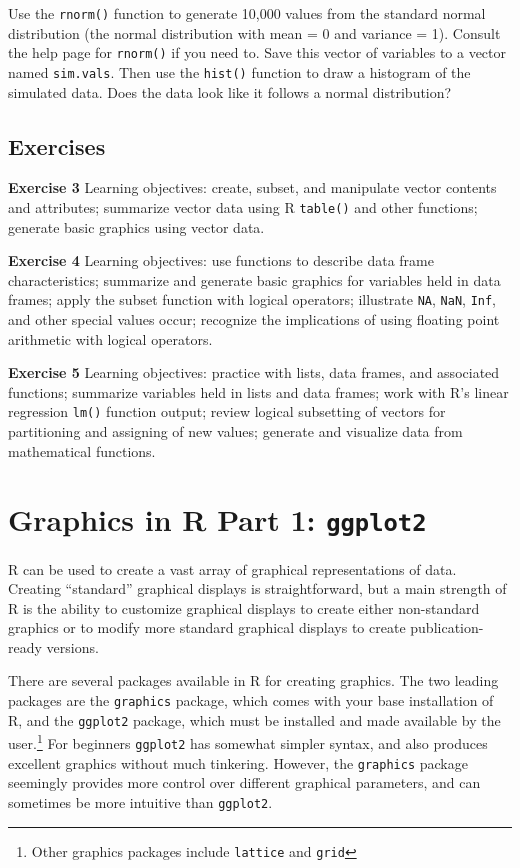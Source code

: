 \documentclass[]{krantz}
\begin{document}
Use the \texttt{rnorm()} function to generate 10,000 values from the
standard normal distribution (the normal distribution with mean = 0 and
variance = 1). Consult the help page for \texttt{rnorm()} if you need
to. Save this vector of variables to a vector named \texttt{sim.vals}.
Then use the \texttt{hist()} function to draw a histogram of the
simulated data. Does the data look like it follows a normal
distribution?

\section{Exercises}\label{exercises-1}

\textbf{Exercise 3} Learning objectives: create, subset, and manipulate
vector contents and attributes; summarize vector data using R
\texttt{table()} and other functions; generate basic graphics using
vector data.

\textbf{Exercise 4} Learning objectives: use functions to describe data
frame characteristics; summarize and generate basic graphics for
variables held in data frames; apply the subset function with logical
operators; illustrate \texttt{NA}, \texttt{NaN}, \texttt{Inf}, and other
special values occur; recognize the implications of using floating point
arithmetic with logical operators.

\textbf{Exercise 5} Learning objectives: practice with lists, data
frames, and associated functions; summarize variables held in lists and
data frames; work with R's linear regression \texttt{lm()} function
output; review logical subsetting of vectors for partitioning and
assigning of new values; generate and visualize data from mathematical
functions.

\chapter{\texorpdfstring{Graphics in R Part 1:
\texttt{ggplot2}}{Graphics in R Part 1: ggplot2}}\label{graphics-in-r-part-1-ggplot2}

R can be used to create a vast array of graphical representations of
data. Creating ``standard'' graphical displays is straightforward, but a
main strength of R is the ability to customize graphical displays to
create either non-standard graphics or to modify more standard graphical
displays to create publication-ready versions.

There are several packages available in R for creating graphics. The two
leading packages are the \texttt{graphics} package, which comes with
your base installation of R, and the \texttt{ggplot2} package, which
must be installed and made available by the user.\footnote{Other
  graphics packages include \texttt{lattice} and \texttt{grid}} For
beginners \texttt{ggplot2} has somewhat simpler syntax, and also
produces excellent graphics without much tinkering. However, the
\texttt{graphics} package seemingly provides more control over different
graphical parameters, and can sometimes be more intuitive than
\texttt{ggplot2}.
\end{document}
